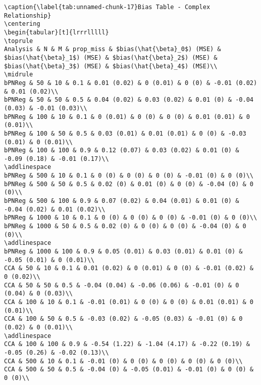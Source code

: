 \documentclass[
]{article}
\begin{document}
\begin{verbatim}
\caption{\label{tab:unnamed-chunk-17}Bias Table - Complex Relationship}
\centering
\begin{tabular}[t]{lrrrlllll}
\toprule
Analysis & N & M & prop_miss & $bias(\hat{\beta}_0$) (MSE) & $bias(\hat{\beta}_1$) (MSE) & $bias(\hat{\beta}_2$) (MSE) & $bias(\hat{\beta}_3$) (MSE) & $bias(\hat{\beta}_4$) (MSE)\\
\midrule
bPNReg & 50 & 10 & 0.1 & 0.01 (0.02) & 0 (0.01) & 0 (0) & -0.01 (0.02) & 0.01 (0.02)\\
bPNReg & 50 & 50 & 0.5 & 0.04 (0.02) & 0.03 (0.02) & 0.01 (0) & -0.04 (0.03) & -0.01 (0.03)\\
bPNReg & 100 & 10 & 0.1 & 0 (0.01) & 0 (0) & 0 (0) & 0.01 (0.01) & 0 (0.01)\\
bPNReg & 100 & 50 & 0.5 & 0.03 (0.01) & 0.01 (0.01) & 0 (0) & -0.03 (0.01) & 0 (0.01)\\
bPNReg & 100 & 100 & 0.9 & 0.12 (0.07) & 0.03 (0.02) & 0.01 (0) & -0.09 (0.18) & -0.01 (0.17)\\
\addlinespace
bPNReg & 500 & 10 & 0.1 & 0 (0) & 0 (0) & 0 (0) & -0.01 (0) & 0 (0)\\
bPNReg & 500 & 50 & 0.5 & 0.02 (0) & 0.01 (0) & 0 (0) & -0.04 (0) & 0 (0)\\
bPNReg & 500 & 100 & 0.9 & 0.07 (0.02) & 0.04 (0.01) & 0.01 (0) & -0.04 (0.02) & 0.01 (0.02)\\
bPNReg & 1000 & 10 & 0.1 & 0 (0) & 0 (0) & 0 (0) & -0.01 (0) & 0 (0)\\
bPNReg & 1000 & 50 & 0.5 & 0.02 (0) & 0 (0) & 0 (0) & -0.04 (0) & 0 (0)\\
\addlinespace
bPNReg & 1000 & 100 & 0.9 & 0.05 (0.01) & 0.03 (0.01) & 0.01 (0) & -0.05 (0.01) & 0 (0.01)\\
CCA & 50 & 10 & 0.1 & 0.01 (0.02) & 0 (0.01) & 0 (0) & -0.01 (0.02) & 0 (0.02)\\
CCA & 50 & 50 & 0.5 & -0.04 (0.04) & -0.06 (0.06) & -0.01 (0) & 0 (0.04) & 0 (0.03)\\
CCA & 100 & 10 & 0.1 & -0.01 (0.01) & 0 (0) & 0 (0) & 0.01 (0.01) & 0 (0.01)\\
CCA & 100 & 50 & 0.5 & -0.03 (0.02) & -0.05 (0.03) & -0.01 (0) & 0 (0.02) & 0 (0.01)\\
\addlinespace
CCA & 100 & 100 & 0.9 & -0.54 (1.22) & -1.04 (4.17) & -0.22 (0.19) & -0.05 (0.26) & -0.02 (0.13)\\
CCA & 500 & 10 & 0.1 & -0.01 (0) & 0 (0) & 0 (0) & 0 (0) & 0 (0)\\
CCA & 500 & 50 & 0.5 & -0.04 (0) & -0.05 (0.01) & -0.01 (0) & 0 (0) & 0 (0)\\

\end{verbatim}
\end{document}
